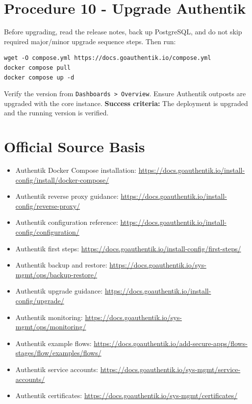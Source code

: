 \documentclass[11pt]{article}
\newcommand{\ok}{\textbf{Success criteria:} }
\newcommand{\sourcebasis}{\section*{Official Source Basis}\begin{itemize}
\item Authentik Docker Compose installation: \url{https://docs.goauthentik.io/install-config/install/docker-compose/}
\item Authentik reverse proxy guidance: \url{https://docs.goauthentik.io/install-config/reverse-proxy/}
\item Authentik configuration reference: \url{https://docs.goauthentik.io/install-config/configuration/}
\item Authentik first steps: \url{https://docs.goauthentik.io/install-config/first-steps/}
\item Authentik backup and restore: \url{https://docs.goauthentik.io/sys-mgmt/ops/backup-restore/}
\item Authentik upgrade guidance: \url{https://docs.goauthentik.io/install-config/upgrade/}
\item Authentik monitoring: \url{https://docs.goauthentik.io/sys-mgmt/ops/monitoring/}
\item Authentik example flows: \url{https://docs.goauthentik.io/add-secure-apps/flows-stages/flow/examples/flows/}
\item Authentik service accounts: \url{https://docs.goauthentik.io/sys-mgmt/service-accounts/}
\item Authentik certificates: \url{https://docs.goauthentik.io/sys-mgmt/certificates/}
\end{itemize}}
\begin{document}
\section*{Procedure 10 - Upgrade Authentik}
Before upgrading, read the release notes, back up PostgreSQL, and do not skip required major/minor upgrade sequence steps. Then run:
\begin{verbatim}
wget -O compose.yml https://docs.goauthentik.io/compose.yml
docker compose pull
docker compose up -d
\end{verbatim}
Verify the version from \texttt{Dashboards > Overview}. Ensure Authentik outposts are upgraded with the core instance.
\ok The deployment is upgraded and the running version is verified.

\sourcebasis
\end{document}
